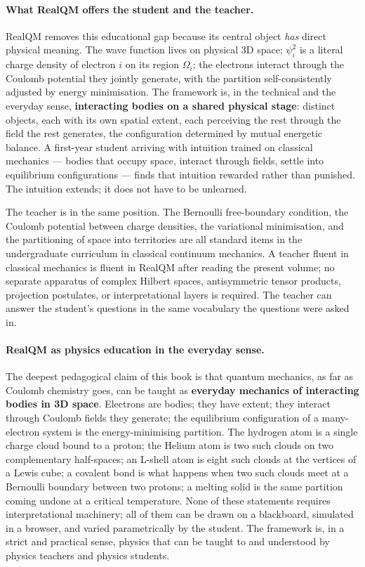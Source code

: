 \paragraph{What RealQM offers the student and the teacher.}
RealQM removes this educational gap because its central object \emph{has} direct physical meaning. The wave function lives on physical 3D space; $\psi_i^2$ is a literal charge density of electron $i$ on its region $\Omega_i$; the electrons interact through the Coulomb potential they jointly generate, with the partition self-consistently adjusted by energy minimisation. The framework is, in the technical and the everyday sense, \textbf{interacting bodies on a shared physical stage}: distinct objects, each with its own spatial extent, each perceiving the rest through the field the rest generates, the configuration determined by mutual energetic balance. A first-year student arriving with intuition trained on classical mechanics --- bodies that occupy space, interact through fields, settle into equilibrium configurations --- finds that intuition rewarded rather than punished. The intuition extends; it does not have to be unlearned.

The teacher is in the same position. The Bernoulli free-boundary condition, the Coulomb potential between charge densities, the variational minimisation, and the partitioning of space into territories are all standard items in the undergraduate curriculum in classical continuum mechanics. A teacher fluent in classical mechanics is fluent in RealQM after reading the present volume; no separate apparatus of complex Hilbert spaces, antisymmetric tensor products, projection postulates, or interpretational layers is required. The teacher can answer the student's questions in the same vocabulary the questions were asked in.

\paragraph{RealQM as physics education in the everyday sense.}
The deepest pedagogical claim of this book is that quantum mechanics, as far as Coulomb chemistry goes, can be taught as \textbf{everyday mechanics of interacting bodies in 3D space}. Electrons are bodies; they have extent; they interact through Coulomb fields they generate; the equilibrium configuration of a many-electron system is the energy-minimising partition. The hydrogen atom is a single charge cloud bound to a proton; the Helium atom is two such clouds on two complementary half-spaces; an L-shell atom is eight such clouds at the vertices of a Lewis cube; a covalent bond is what happens when two such clouds meet at a Bernoulli boundary between two protons; a melting solid is the same partition coming undone at a critical temperature. None of these statements requires interpretational machinery; all of them can be drawn on a blackboard, simulated in a browser, and varied parametrically by the student. The framework is, in a strict and practical sense, physics that can be taught to and understood by physics teachers and physics students.

